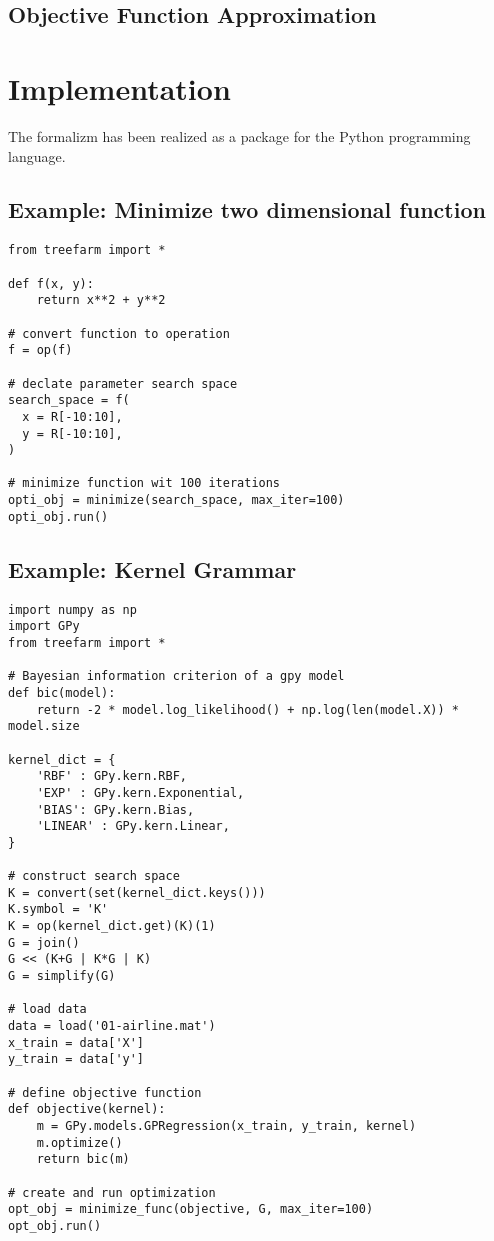 \documentclass[english]{article}
\begin{document}
\subsection{Objective Function Approximation}


\section{Implementation}
The formalizm has been realized as a package for the Python programming language.

\subsection{Example: Minimize two dimensional function}

\begin{verbatim}
from treefarm import *

def f(x, y):
    return x**2 + y**2

# convert function to operation
f = op(f)

# declate parameter search space
search_space = f(
  x = R[-10:10],
  y = R[-10:10],
)

# minimize function wit 100 iterations
opti_obj = minimize(search_space, max_iter=100)
opti_obj.run()

\end{verbatim}

\subsection{Example: Kernel Grammar}

\begin{verbatim}
import numpy as np
import GPy
from treefarm import *

# Bayesian information criterion of a gpy model
def bic(model):
    return -2 * model.log_likelihood() + np.log(len(model.X)) * model.size

kernel_dict = {
    'RBF' : GPy.kern.RBF,
    'EXP' : GPy.kern.Exponential,
    'BIAS': GPy.kern.Bias,
    'LINEAR' : GPy.kern.Linear,
}

# construct search space
K = convert(set(kernel_dict.keys()))
K.symbol = 'K'
K = op(kernel_dict.get)(K)(1)
G = join()
G << (K+G | K*G | K)
G = simplify(G)

# load data
data = load('01-airline.mat')
x_train = data['X']
y_train = data['y']

# define objective function
def objective(kernel):
    m = GPy.models.GPRegression(x_train, y_train, kernel)
    m.optimize()
    return bic(m)

# create and run optimization
opt_obj = minimize_func(objective, G, max_iter=100)
opt_obj.run()

\end{verbatim}
\end{document}
